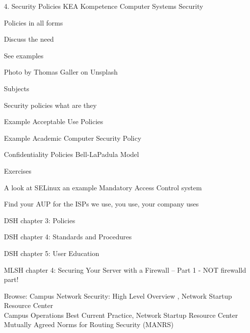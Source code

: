\documentclass[Screen16to9,17pt]{foils}
\begin{document}
\mytitlepage
{4. Security Policies}
{KEA Kompetence Computer Systems Security \the\year}




\begin{list2}
\item Policies in all forms
\item Discuss the need
\item See examples
\end{list2}

{\small\hfill  Photo by Thomas Galler on Unsplash}


\begin{list1}
\item Subjects
\begin{list2}
\item Security policies what are they
  \item Example Acceptable Use Policies
  \item Example Academic Computer Security Policy
  \item Confidentiality Policies Bell-LaPadula Model
\end{list2}
\item Exercises
\begin{list2}
\item A look at SELinux an example Mandatory Access Control system
\item Find your AUP for the ISPs we use, you use, your company uses
\end{list2}
\end{list1}


\begin{list1}
\item DSH chapter 3: Policies
\item DSH chapter 4: Standards and Procedures
\item DSH chapter 5: User Education
\item MLSH chapter 4: Securing Your Server with a
Firewall – Part 1 - NOT firewalld part!

\item Browse: Campus Network Security: High Level Overview , Network Startup Resource Center\\
Campus Operations Best Current Practice, Network Startup Resource Center\\
Mutually Agreed Norms for Routing Security (MANRS)
\end{list1}
\end{document}
